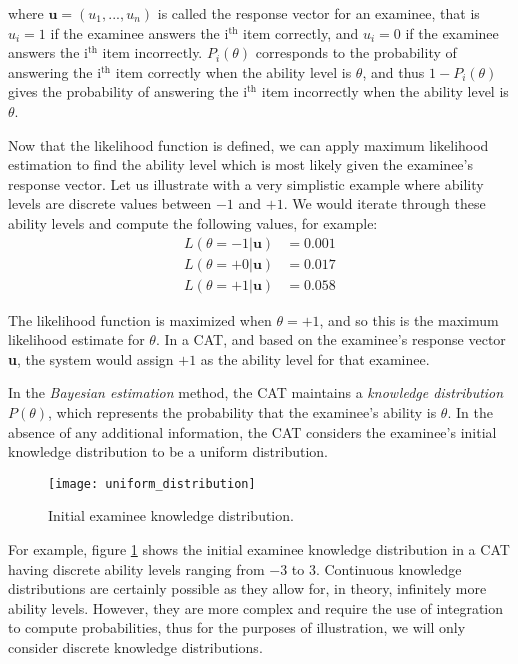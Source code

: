 where $\textbf{u}=(u_1, ..., u_n)$ is called the response vector for an examinee, that is $u_i=1$ if the examinee answers the i$^\text{th}$ item correctly, and $u_i=0$ if the examinee answers the i$^\text{th}$ item incorrectly. $P_i(\theta)$ corresponds to the probability of answering the i$^\text{th}$ item correctly when the ability level is $\theta$, and thus $1 - P_i(\theta)$ gives the probability of answering the i$^\text{th}$ item incorrectly when the ability level is $\theta$. \newline

Now that the likelihood function is defined, we can apply maximum likelihood estimation to find the ability level which is most likely given the examinee's response vector. Let us illustrate with a very simplistic example where ability levels are discrete values between $-1$ and $+1$. We would iterate through these ability levels and compute the following values, for example:
\begin{align*}
L(\theta=-1 | \textbf{u}) &= 0.001 \\
L(\theta=+0 | \textbf{u}) &= 0.017 \\
L(\theta=+1 | \textbf{u}) &= 0.058
\end{align*}

The likelihood function is maximized when $\theta = +1$, and so this is the maximum likelihood estimate for $\theta$. In a CAT, and based on the examinee's response vector \textbf{u}, the system would assign $+1$ as the ability level for that examinee.\newline

In the \textit{Bayesian estimation} method, the CAT maintains a \textit{knowledge distribution} $P(\theta)$, which represents the probability that the examinee's ability is $\theta$. In the absence of any additional information, the CAT considers the examinee's initial knowledge distribution to be a uniform distribution.

\begin{figure}[H]
\centering
\texttt{[image: uniform\_distribution]}
\caption{Initial examinee knowledge distribution.}
\label{fig:uniform_distribution}
\end{figure}

For example, figure \ref{fig:uniform_distribution} shows the initial examinee knowledge distribution in a CAT having discrete ability levels ranging from $-3$ to $3$. Continuous knowledge distributions are certainly possible as they allow for, in theory, infinitely more ability levels. However, they are more complex and require the use of integration to compute probabilities, thus for the purposes of illustration, we will only consider discrete knowledge distributions. \newline

